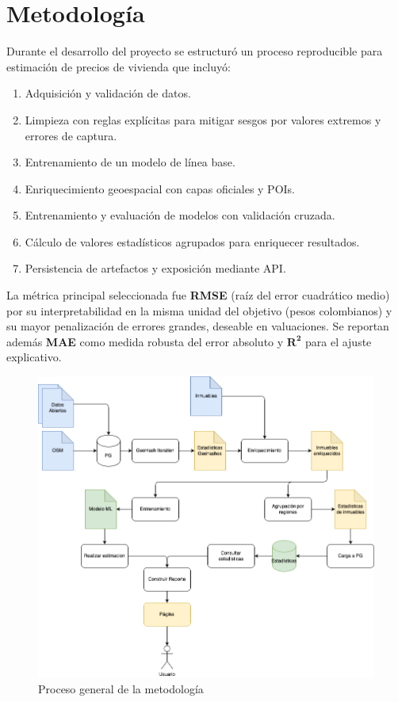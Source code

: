 \section*{Metodología}
Durante el desarrollo del proyecto se estructuró un proceso reproducible para estimación 
de precios de vivienda que incluyó:
\begin{enumerate}
    \item Adquisición y validación de datos.
    \item Limpieza con reglas explícitas para mitigar sesgos por valores extremos y errores de captura.
    \item Entrenamiento de un modelo de línea base.
    \item Enriquecimiento geoespacial con capas oficiales y POIs.
    \item Entrenamiento y evaluación de modelos con validación cruzada.
    \item Cálculo de valores estadísticos agrupados para enriquecer resultados.
    \item Persistencia de artefactos y exposición mediante API.
\end{enumerate}


La métrica principal seleccionada fue \textbf{RMSE} (raíz del error cuadrático medio) por su interpretabilidad en la misma unidad del objetivo (pesos colombianos) y su mayor penalización de errores grandes, deseable en valuaciones. Se reportan además \textbf{MAE} como medida robusta del error absoluto y \(\mathbf{R^2}\) para el ajuste explicativo.


\begin{figure}[h]
    \centering
    \includegraphics[width=0.85\linewidth]{Images/metodologia.png}
    \caption{Proceso general de la metodología}
    \label{fig:metodologia}
\end{figure}


